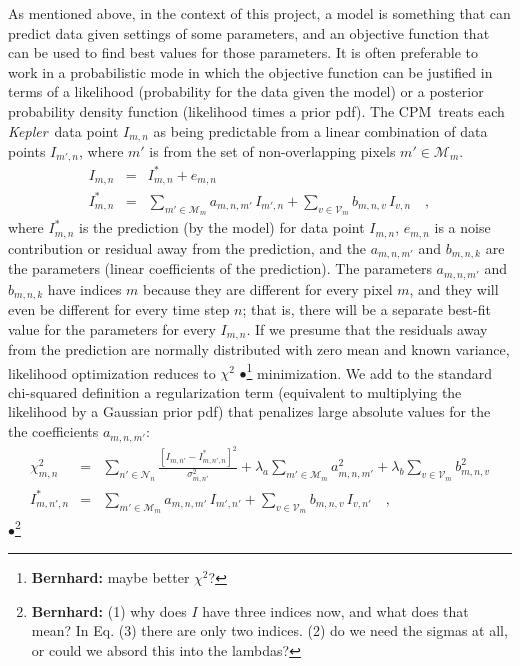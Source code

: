 \documentclass[12pt, preprint]{aastex}
\newcommand{\project}[1]{\textsl{#1}}
\newcommand{\Kepler}{\project{Kepler}}
\newcommand{\name}{CPM}
\newcommand{\set}[1]{\mathcal{#1}}
\newcommand{\Bernhard}[1]{$\bullet$\footnote{{\bf Bernhard:} #1}}
\begin{document}
As mentioned above, in the context of this project,
  a model is something that can predict data given settings of some parameters,
  and an objective function that can be used to find best values for those parameters.
It is often preferable to work in a probabilistic mode in which the objective function can be justified
  in terms of a likelihood (probability for the data given the model)
  or a posterior probability density function (likelihood times a prior pdf).
The \name\ treats each \Kepler\ data point $I_{m,n}$ as being
  predictable from a linear combination of data points $I_{m',n}$,
  where $m'$ is from the set of non-overlapping pixels $m'\in\set{M}_m$.
\begin{eqnarray}
I_{m,n}         &=& I^{\ast}_{m,n} + e_{m,n}
\\
I^{\ast}_{m,n}  &=& \sum_{m'\in\set{M}_m} a_{m,n,m'}\,I_{m',n} + \sum_{v\in\set{V}_m} b_{m,n,v}\,I_{v,n}
\quad,
\end{eqnarray}
where $I^{\ast}_{m,n}$ is the prediction (by the model) for data point $I_{m,n}$,
  $e_{m,n}$ is a noise contribution or residual away from the prediction,
  and the $a_{m,n,m'}$ and $b_{m,n,k}$ are the parameters (linear coefficients of the prediction).
The parameters $a_{m,n,m'}$ and $b_{m,n,k}$ have indices $m$ because
  they are different for every pixel $m$,
  and they will even be different for every time step $n$;
  that is, there will be a separate best-fit value for the parameters for every $I_{m,n}$.
If we presume that the residuals away from the prediction are normally distributed with zero mean
  and known variance,
  likelihood optimization reduces to $\chi^2$ \Bernhard{maybe better $\chi^2$?} minimization.
We add to the standard chi-squared definition a regularization term
  (equivalent to multiplying the likelihood by a Gaussian prior pdf)
  that penalizes large absolute values for the the coefficients $a_{m,n,m'}$:
\begin{eqnarray}
\chi^2_{m,n}    &=& \sum_{n'\in\set{N}_n} \frac{[I_{m,n'} - I^{\ast}_{m,n',n}]^2}{\sigma^2_{m,n'}}
                 + \lambda_{a}\sum_{m'\in\set{M}_m}a_{m,n,m'}^2 + \lambda_{b}\sum_{v\in\set{V}_m}b_{m,n,v}^2
\\
I^{\ast}_{m,n',n} &=& \sum_{m'\in\set{M}_m} a_{m,n,m'}\,I_{m',n'} + \sum_{v\in\set{V}_m} b_{m,n,v}\,I_{v,n'}
\quad,
\end{eqnarray}
\Bernhard{(1) why does $I$ have three indices now, and what does that mean? In Eq. (3) there are only two indices. (2) do we need the sigmas at all, or could we absord this into the lambdas?}
\end{document}
